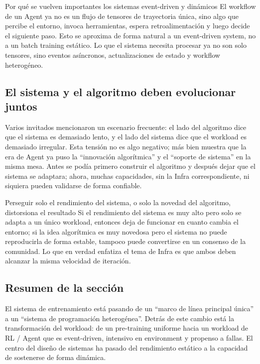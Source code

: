 \begin{knowledgebox}{Por qué se vuelven importantes los sistemas event-driven y dinámicos}
El workflow de un Agent ya no es un flujo de tensores de trayectoria única, sino algo que percibe el entorno, invoca herramientas, espera retroalimentación y luego decide el siguiente paso. Esto se aproxima de forma natural a un event-driven system, no a un batch training estático. Lo que el sistema necesita procesar ya no son solo tensores, sino eventos asíncronos, actualizaciones de estado y workflow heterogéneo.
\end{knowledgebox}

\subsection{El sistema y el algoritmo deben evolucionar juntos}
Varios invitados mencionaron un escenario frecuente: el lado del algoritmo dice que el sistema es demasiado lento, y el lado del sistema dice que el workload es demasiado irregular. Esta tensión no es algo negativo; más bien muestra que la era de Agent ya puso la ``innovación algorítmica'' y el ``soporte de sistema'' en la misma mesa. Antes se podía primero construir el algoritmo y después dejar que el sistema se adaptara; ahora, muchas capacidades, sin la Infra correspondiente, ni siquiera pueden validarse de forma confiable.

\begin{warningbox}{Perseguir solo el rendimiento del sistema, o solo la novedad del algoritmo, distorsiona el resultado}
Si el rendimiento del sistema es muy alto pero solo se adapta a un único workload, entonces deja de funcionar en cuanto cambia el entorno; si la idea algorítmica es muy novedosa pero el sistema no puede reproducirla de forma estable, tampoco puede convertirse en un consenso de la comunidad. Lo que en verdad enfatiza el tema de Infra es que ambos deben alcanzar la misma velocidad de iteración.
\end{warningbox}

\subsection{Resumen de la sección}
El sistema de entrenamiento está pasando de un ``marco de línea principal única'' a un ``sistema de programación heterogénea''. Detrás de este cambio está la transformación del workload: de un pre-training uniforme hacia un workload de RL / Agent que es event-driven, intensivo en environment y propenso a fallas. El centro del diseño de sistemas ha pasado del rendimiento estático a la capacidad de sostenerse de forma dinámica.
